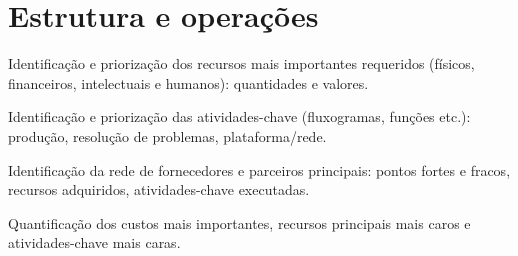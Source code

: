 \chapter{Estrutura e operações}
\label{chapter: Estrutura e operações}







\begin{commentB}
	
	\par \end{commentB}







\begin{commentA}
Identificação e priorização dos recursos mais importantes requeridos (físicos, financeiros, intelectuais e humanos): quantidades e valores.
\par \end{commentA}



\begin{commentA}
Identificação e priorização das atividades-chave (fluxogramas, funções etc.): produção, resolução de problemas, plataforma/rede.
\par \end{commentA}



\begin{commentA}
Identificação da rede de fornecedores e parceiros principais: pontos fortes e fracos, recursos adquiridos, atividades-chave executadas.
\par \end{commentA}



\begin{commentA}
Quantificação dos custos mais importantes, recursos principais mais caros e atividades-chave mais caras.    
\par \end{commentA}



\begin{commentA}

\par \end{commentA}




